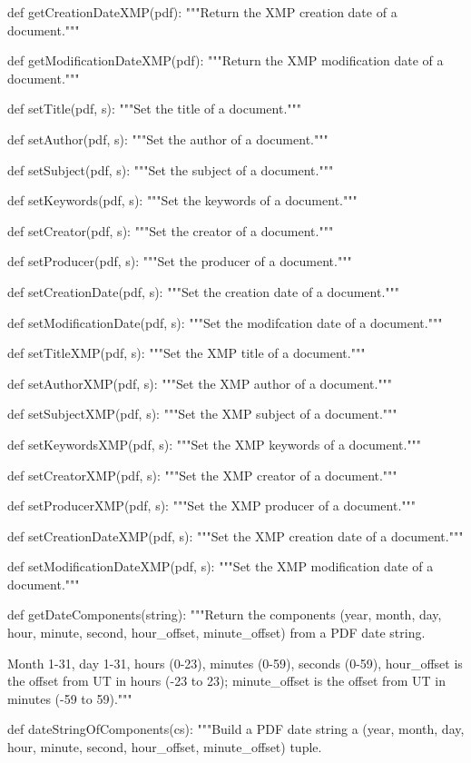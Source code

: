 def getCreationDateXMP(pdf):
    """Return the XMP creation date of a document."""

def getModificationDateXMP(pdf):
    """Return the XMP modification date of a document."""

def setTitle(pdf, s):
    """Set the title of a document."""

def setAuthor(pdf, s):
    """Set the author of a document."""

def setSubject(pdf, s):
    """Set the subject of a document."""

def setKeywords(pdf, s):
    """Set the keywords of a document."""

def setCreator(pdf, s):
    """Set the creator of a document."""

def setProducer(pdf, s):
    """Set the producer of a document."""

def setCreationDate(pdf, s):
    """Set the creation date of a document."""

def setModificationDate(pdf, s):
    """Set the modifcation date of a document."""

def setTitleXMP(pdf, s):
    """Set the XMP title of a document."""

def setAuthorXMP(pdf, s):
    """Set the XMP author of a document."""

def setSubjectXMP(pdf, s):
    """Set the XMP subject of a document."""

def setKeywordsXMP(pdf, s):
    """Set the XMP keywords of a document."""

def setCreatorXMP(pdf, s):
    """Set the XMP creator of a document."""

def setProducerXMP(pdf, s):
    """Set the XMP producer of a document."""

def setCreationDateXMP(pdf, s):
    """Set the XMP creation date of a document."""

def setModificationDateXMP(pdf, s):
    """Set the XMP modification date of a document."""

def getDateComponents(string):
    """Return the components (year, month, day, hour, minute, second,
    hour_offset, minute_offset) from a PDF date string.

    Month 1-31, day 1-31, hours (0-23), minutes (0-59), seconds (0-59),
    hour_offset is the offset from UT in hours (-23 to 23); minute_offset is
    the offset from UT in minutes (-59 to 59)."""

def dateStringOfComponents(cs):
    """Build a PDF date string a (year, month, day, hour, minute, second,
    hour_offset, minute_offset) tuple.

